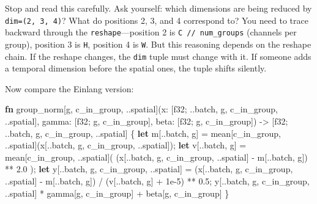 \documentclass[11pt,titlepage]{article}
\newenvironment{Shaded}{}{}
\newcommand{\DataTypeTok}[1]{\textcolor[rgb]{0.56,0.13,0.00}{#1}}
\newcommand{\DecValTok}[1]{\textcolor[rgb]{0.25,0.63,0.44}{#1}}
\newcommand{\KeywordTok}[1]{\textcolor[rgb]{0.00,0.44,0.13}{\textbf{#1}}}
\newcommand{\NormalTok}[1]{#1}
\newcommand{\OperatorTok}[1]{\textcolor[rgb]{0.40,0.40,0.40}{#1}}
\begin{document}
Stop and read this carefully. Ask yourself: which dimensions are being
reduced by \texttt{dim=(2,\ 3,\ 4)}? What do positions 2, 3, and 4
correspond to? You need to trace backward through the
\texttt{reshape}---position 2 is \texttt{C\ //\ num\_groups} (channels
per group), position 3 is \texttt{H}, position 4 is \texttt{W}. But this
reasoning depends on the reshape chain. If the reshape changes, the
\texttt{dim} tuple must change with it. If someone adds a temporal
dimension before the spatial ones, the tuple shifts silently.

Now compare the Einlang version:

\begin{Shaded}
\begin{Highlighting}[]
\KeywordTok{fn}\NormalTok{ group_norm[g, c_in_group, ..spatial](x: }\OperatorTok{[}\DataTypeTok{f32}\NormalTok{; ..batch, g, c_in_group, ..spatial}\OperatorTok{]}\NormalTok{,}
\NormalTok{    gamma: }\OperatorTok{[}\DataTypeTok{f32}\NormalTok{; g, c_in_group}\OperatorTok{]}\NormalTok{, beta: }\OperatorTok{[}\DataTypeTok{f32}\NormalTok{; g, c_in_group}\OperatorTok{]}\NormalTok{)}
\NormalTok{    -> }\OperatorTok{[}\DataTypeTok{f32}\NormalTok{; ..batch, g, c_in_group, ..spatial}\OperatorTok{]}
\OperatorTok{\{}
    \KeywordTok{let}\NormalTok{ m}\OperatorTok{[}\NormalTok{..batch, g}\OperatorTok{]}\NormalTok{ = mean}\OperatorTok{[}\NormalTok{c_in_group, ..spatial}\OperatorTok{]}\NormalTok{(x}\OperatorTok{[}\NormalTok{..batch, g, c_in_group, ..spatial}\OperatorTok{]}\NormalTok{);}
    \KeywordTok{let}\NormalTok{ v}\OperatorTok{[}\NormalTok{..batch, g}\OperatorTok{]}\NormalTok{ = mean}\OperatorTok{[}\NormalTok{c_in_group, ..spatial}\OperatorTok{]}\NormalTok{(}
\NormalTok{        (x}\OperatorTok{[}\NormalTok{..batch, g, c_in_group, ..spatial}\OperatorTok{]}\NormalTok{ - m}\OperatorTok{[}\NormalTok{..batch, g}\OperatorTok{]}\NormalTok{) ** }\DecValTok{2.0}
\NormalTok{    );}
    \KeywordTok{let}\NormalTok{ y}\OperatorTok{[}\NormalTok{..batch, g, c_in_group, ..spatial}\OperatorTok{]}\NormalTok{ =}
\NormalTok{        (x}\OperatorTok{[}\NormalTok{..batch, g, c_in_group, ..spatial}\OperatorTok{]}\NormalTok{ - m}\OperatorTok{[}\NormalTok{..batch, g}\OperatorTok{]}\NormalTok{)}
\NormalTok{        / (v}\OperatorTok{[}\NormalTok{..batch, g}\OperatorTok{]}\NormalTok{ + }\DecValTok{1}\NormalTok{e-}\DecValTok{5}\NormalTok{) ** }\DecValTok{0.5}\NormalTok{;}
\NormalTok{    y}\OperatorTok{[}\NormalTok{..batch, g, c_in_group, ..spatial}\OperatorTok{]}\NormalTok{ * gamma}\OperatorTok{[}\NormalTok{g, c_in_group}\OperatorTok{]}\NormalTok{ + beta}\OperatorTok{[}\NormalTok{g, c_in_group}\OperatorTok{]}
\OperatorTok{\}}
\end{Highlighting}
\end{Shaded}
\end{document}
